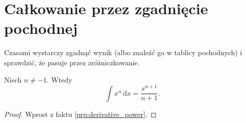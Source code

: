 %

\section{Całkowanie przez zgadnięcie pochodnej}

Czasami wystarczy zgadnąć wynik (albo znaleźć go w tablicy pochodnych) i sprawdzić, że pasuje przez zróżniczkowanie.

\begin{problem}
    Niech $n \neq -1$.
    Wtedy
    \begin{equation}
        \int x^n \,\mathrm{d}x = \frac{x^{n+1}}{n+1}.
    \end{equation}
\end{problem}

\begin{proof}
    Wprost z faktu \ref{prp:derivative_power}.
\end{proof}

%